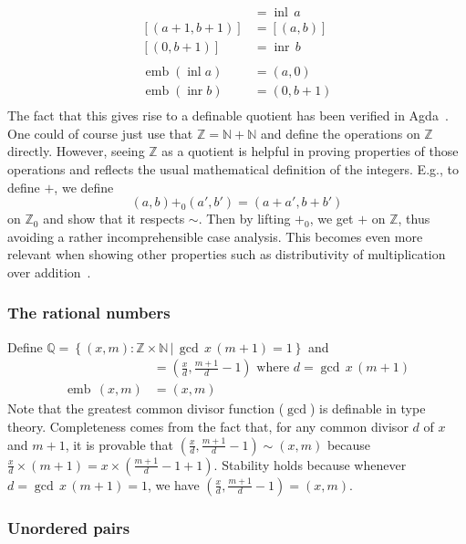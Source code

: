 \documentclass[envcountsame]{llncs}
\newcommand{\N}{\mathbb{N}}
\newcommand{\Q}{\mathbb{Q}}
\newcommand{\Z}{\mathbb{Z}}
\providecommand{\class}[1]{[#1]}
\providecommand{\set}  [1]{\left\{#1\right\}}
\DeclareMathOperator{\emb}{emb}
\DeclareMathOperator{\inl}{inl}
\DeclareMathOperator{\inr}{inr}
\begin{document}
\begin{align*}
\class{(a,0)} &= \inl\,a\\
\class{(a+1,b+1)} &= \class{(a,b)}\\
\class{(0,b+1)} &= \inr\,b\\\\
\emb (\inl a) &= (a,0)\\
\emb (\inr b) &= (0,b+1)\\
\end{align*}
The fact that this gives rise to a definable quotient has been verified in Agda~\cite{nuo2010report}.
 One could of course just use that $\Z=\N + \N$ and define the operations on $\Z$ directly. However, seeing  $\Z$ as a quotient is helpful in proving properties of those operations and reflects the usual mathematical definition of the integers. E.g., to define $+$, we define
\[(a,b){+_0}(a', b')= (a+a',b+b')\]
on $\Z_0$ and show that it respects $\sim$. Then by lifting $+_0$, we get $+$ on $\Z$, thus avoiding a rather incomprehensible case analysis. This becomes even more relevant when showing other properties such as distributivity of multiplication over addition~\cite{nuo2010report}.

\subsubsection*{The rational numbers}

Define $\Q = \set{(x,m):\Z\times\N \,|\, \gcd\, x\,  (m+1) = 1}$ and
\begin{align*}
\class{(x,m)}&=\left(\frac{x}{d},\frac{m+1}{d}-1\right) \text{ where } d = \gcd\,x \,(m+1)\\
\emb \,(x,m) &= (x,m)
\end{align*}
Note that the greatest common divisor function ($\gcd$) is definable in type theory. Completeness comes from the fact that, for any common divisor $d$ of $x$ and $m+1$, it is provable that $\left(\frac x d,\frac {m+1} d-1\right)\sim\left(x,m\right)$ because $\frac x d \times (m+1) = x\times(\frac {m+1} d - 1+1)$.  Stability holds because whenever $d=\gcd\, x\, (m+1) = 1$, we have $\left(\frac{x}{d},\frac{m+1}{d}-1\right)=(x,m)$.


\subsubsection*{Unordered pairs}
\end{document}
